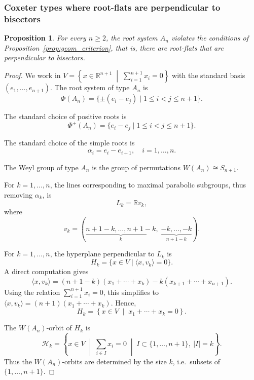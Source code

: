 \documentclass[11pt]{amsart}
\theoremstyle{plain}
\newtheorem{prop}[thm]{Proposition}
\theoremstyle{definition}
\theoremstyle{remark}
\begin{document}
	\subsubsection{Coxeter types where root-flats are perpendicular to bisectors}
	\label{subsec::perp_bisectors}
	
	\begin{prop}
		\label{prop:An}
		For every $n\ge 2$, the root system $A_n$ violates the conditions of Proposition~\ref{prop:geom_criterion}, that is, there are root-flats that are perpendicular to bisectors.
	\end{prop}
	
	\begin{proof}
		
		We work in  $V = \left\{ x \in \mathbb{R}^{n+1} \;\middle|\; \sum_{i=1}^{n+1} x_i = 0 \right\}$
		with the standard basis $(e_1,\dots,e_{n+1})$. The root system of type $A_n$ is 
		\[
		\Phi(A_n)
		=
		\{ \pm (e_i - e_j) \mid 1 \le i < j \le n+1 \}.
		\]
		
		The standard choice of positive roots is 
		\[
		\Phi^+(A_n)
		=
		\{ e_i - e_j \mid 1 \le i < j \le n+1 \}.
		\]
		
		The standard choice of the simple roots is
		\[
		\alpha_i = e_i - e_{i+1}, \quad i=1,\dots,n.
		\]
		
		The Weyl group of type $A_n$ is the group of permutations $
		W(A_n) \cong S_{n+1}$.
		
		For $k=1,\dots,n$, the lines corresponding to maximal parabolic subgroups, thus removing $\alpha_k$, is
		\[
		L_k = \mathbb{R} v_k,
		\]
		where
		\[
		v_k =
		(\underbrace{n+1-k,\dots,n+1-k}_{k},\;
		\underbrace{-k,\dots,-k}_{n+1-k}).
		\]
		
		For $k=1,\dots,n$, the hyperplane perpendicular to $L_k$ is
		\[
		H_k
		=
		\{ x \in V \mid \langle x, v_k \rangle = 0 \}.
		\]
		A direct computation gives
		\[
		\langle x, v_k \rangle
		= (n+1-k)(x_1 + \cdots + x_k)
		- k(x_{k+1} + \cdots + x_{n+1}).
		\]
		Using the relation $\sum_{i=1}^{n+1} x_i = 0$, this simplifies to $\langle x, v_k \rangle = (n+1)(x_1 + \cdots + x_k)$.
		Hence,
		\[
		H_k
		=
		\left\{ x \in V \;\middle|\; x_1 + \cdots + x_k = 0 \right\}.
		\]
		
		The $W(A_n)$-orbit of $H_k$ is
		\[
		\mathcal{H}_k
		=
		\left\{
		x \in V \;\middle|\;
		\sum_{i \in I} x_i = 0
		\;\middle|\;
		I \subset \{1,\dots,n+1\},\ |I| = k
		\right\}.
		\]
		Thus the $W(A_n)$-orbits are determined by the size $k$, i.e.\ subsets of $\{1,\dots,n+1\}$.
		

\end{proof}
\end{document}
